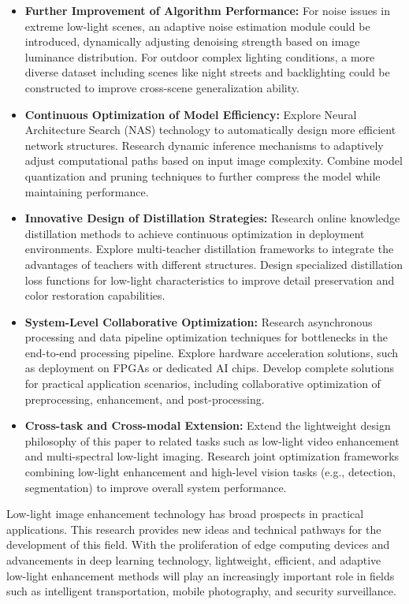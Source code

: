 \documentclass[sensors,article,submit,moreauthors]{Definitions/mdpi}
\begin{document}
\begin{itemize}
\item \textbf{Further Improvement of Algorithm Performance:} For noise issues in extreme low-light scenes, an adaptive noise estimation module could be introduced, dynamically adjusting denoising strength based on image luminance distribution. For outdoor complex lighting conditions, a more diverse dataset including scenes like night streets and backlighting could be constructed to improve cross-scene generalization ability.
\item \textbf{Continuous Optimization of Model Efficiency:} Explore Neural Architecture Search (NAS) technology to automatically design more efficient network structures. Research dynamic inference mechanisms to adaptively adjust computational paths based on input image complexity. Combine model quantization and pruning techniques to further compress the model while maintaining performance.
\item \textbf{Innovative Design of Distillation Strategies:} Research online knowledge distillation methods to achieve continuous optimization in deployment environments. Explore multi-teacher distillation frameworks to integrate the advantages of teachers with different structures. Design specialized distillation loss functions for low-light characteristics to improve detail preservation and color restoration capabilities.
\item \textbf{System-Level Collaborative Optimization:} Research asynchronous processing and data pipeline optimization techniques for bottlenecks in the end-to-end processing pipeline. Explore hardware acceleration solutions, such as deployment on FPGAs or dedicated AI chips. Develop complete solutions for practical application scenarios, including collaborative optimization of preprocessing, enhancement, and post-processing.
\item \textbf{Cross-task and Cross-modal Extension:} Extend the lightweight design philosophy of this paper to related tasks such as low-light video enhancement and multi-spectral low-light imaging. Research joint optimization frameworks combining low-light enhancement and high-level vision tasks (e.g., detection, segmentation) to improve overall system performance.
\end{itemize}

Low-light image enhancement technology has broad prospects in practical applications. This research provides new ideas and technical pathways for the development of this field. With the proliferation of edge computing devices and advancements in deep learning technology, lightweight, efficient, and adaptive low-light enhancement methods will play an increasingly important role in fields such as intelligent transportation, mobile photography, and security surveillance.
\end{document}
